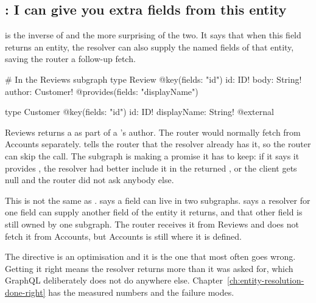 \subsection*{: I can give you extra fields from this entity}

%
 is the inverse of  and the more surprising of
the two. It says that when this field returns an entity, the resolver can also
supply the named fields of that entity, saving the router a follow-up fetch.

\begin{graphqlsdl}
# In the Reviews subgraph
type Review @key(fields: "id") {
  id: ID!
  body: String!
  author: Customer! @provides(fields: "displayName")
}

type Customer @key(fields: "id") {
  id: ID!
  displayName: String! @external
}
\end{graphqlsdl}

Reviews returns a  as part of a 's author. The
router would normally fetch  from Accounts separately.
 tells the router that the resolver
already has it, so the router can skip the call. The subgraph is making a
promise it has to keep: if it says it provides , the resolver
had better include it in the returned , or the client gets null
and the router did not ask anybody else.

%
This is not the same as .  says a field can
live in two subgraphs.  says a resolver for one field can supply
another field of the entity it returns, and that other field is still owned by
one subgraph. The router receives it from Reviews and does not fetch it from
Accounts, but Accounts is still where it is defined.

The directive is an optimisation and it is the one that most often goes wrong.
Getting it right means the resolver returns more than it was asked for, which
GraphQL deliberately does not do anywhere else. Chapter~\ref{ch:entity-resolution-done-right}
has the measured numbers and the failure modes.

%
